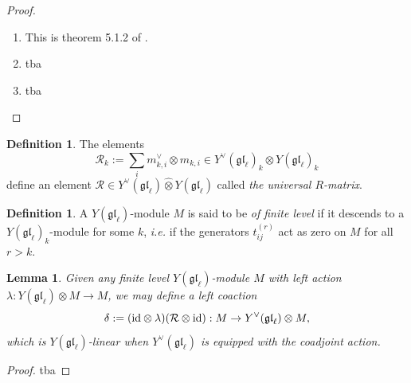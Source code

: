 \documentclass[11pt]{report}
\newtheorem{lemma}[theorem]{Lemma}
\theoremstyle{definition}
\newtheorem{definition}[theorem]{Definition}
\theoremstyle{remark}
\theoremstyle{remark}
\newcommand{\End}{\operatorname{End}}
\newcommand{\id}{\textnormal{id}}
\newcommand{\Z}{\mathbb{Z}}
\newcommand{\C}{\mathbb{C}}
\begin{document}
\begin{proof}
\begin{enumerate}[label=(\roman*)]
\item This is theorem 5.1.2 of \cite{book:molev}.
\item tba
\item tba
\end{enumerate}
\vspace{-\baselineskip}
\end{proof}

\begin{definition}
The elements
\begin{equation*}
\mathcal{R}_k := \sum_i m_{k,i}^\vee \otimes m_{k,i} \in Y^\vee(\mathfrak{gl}_\ell)_k \otimes Y(\mathfrak{gl}_\ell)_k
\end{equation*}
define an element $\mathcal{R} \in Y^\vee(\mathfrak{gl}_\ell) \operatorname{\hat \otimes} Y(\mathfrak{gl}_\ell)$ called \emph{the universal $R$-matrix}.
\end{definition}

\begin{definition}
A $Y(\mathfrak{gl}_\ell)$-module $M$ is said to be \emph{of finite level} if it descends to a $Y(\mathfrak{gl}_\ell)_k$-module for some $k$, \emph{i.e.} if the generators $t_{ij}^{(r)}$ act as zero on $M$ for all $r > k$.
\end{definition}

\begin{lemma}
Given any finite level $Y(\mathfrak{gl}_\ell)$-module $M$ with left action $\lambda: Y(\mathfrak{gl}_\ell) \otimes M \to M$, we may define a left coaction
\begin{equation*}
\delta := (\id \otimes \lambda) (\mathcal{R} \otimes \id): M \to Y^\vee(\mathfrak{gl}_\ell) \otimes M,
\end{equation*}
which is $Y(\mathfrak{gl}_\ell)$-linear when $Y^\vee(\mathfrak{gl}_\ell)$ is equipped with the coadjoint action.
\end{lemma}

\begin{proof}
tba
\end{proof}

 
\end{document}
